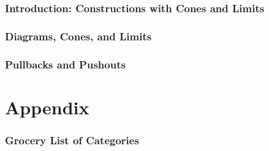 \documentclass{article}
\theoremstyle{plain}
\theoremstyle{definition}
\begin{document}
\section{Introduction: Constructions with Cones and Limits}

\section{Diagrams, Cones, and Limits}

\section{Pullbacks and Pushouts}




%
%

\part*{Appendix}
\begin{appendix}
\section{Grocery List of Categories}

\nocite{*}


\end{appendix}
\end{document}
